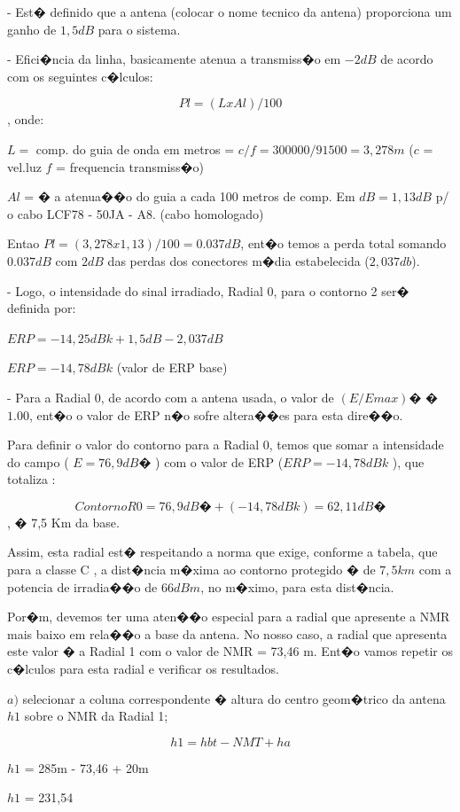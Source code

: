  - Est� definido que a antena (colocar o nome tecnico da antena) proporciona um ganho de $1,5 dB$ para o sistema.

 - Efici�ncia da linha, basicamente atenua  a transmiss�o em $-2 dB$ de acordo com os seguintes c�lculos:


$$Pl = ( L x Al ) / 100$$ , onde:


$L =$ comp. do guia de onda em metros = $c/f = 300000/91500 = 3,278m$ ($c$ = vel.luz $f$ = frequencia transmiss�o) 

$Al$ = � a atenua��o do guia a cada 100 metros de comp. Em $dB  = 1,13dB$ p/ o cabo LCF78 - 50JA - A8. (cabo homologado)

Entao $Pl = (3,278 x 1,13)/ 100 = 0.037 dB$, ent�o temos a perda total somando $0.037 dB$ com $2dB$ das perdas dos conectores m�dia estabelecida ($2,037 db$).

 - Logo, o intensidade do sinal irradiado, Radial 0,  para o contorno 2 ser� definida por:

   $ERP = -14,25dBk + 1,5dB - 2,037 dB$

   $ERP = -14,78dBk $  (valor de ERP base)

 - Para a Radial 0, de acordo com a antena usada, o valor de $(E/Emax)�$ � $1.00$, ent�o o valor de ERP n�o sofre altera��es para esta dire��o. 


Para definir o valor do contorno para a Radial 0, temos que somar a intensidade do campo ( $E = 76,9dB� $ ) com o valor de ERP  ($ERP = -14,78dBk $ ),
que totaliza :

$$ ContornoR0 = 76,9 dB� + (-14,78dBk) = 62,11 dB�$$ , � 7,5 Km da base.

Assim, esta radial est� respeitando a norma que exige, conforme a tabela, que 
para a classe C , a dist�ncia m�xima ao contorno protegido � de $7,5 km$ com a potencia de irradia��o de $66 dBm$, no m�ximo, para esta dist�ncia.

Por�m, devemos ter uma aten��o especial para a radial que apresente a NMR mais baixo em rela��o a base da antena. No nosso caso, a radial que apresenta este valor � a Radial 1
com o valor de NMR = 73,46 m. Ent�o vamos repetir os c�lculos para esta radial e verificar os resultados.

$a)$ selecionar a coluna correspondente � altura do centro geom�trico da antena $h1$ sobre o NMR da Radial 1;

$$h1 = hbt - NMT + ha$$

$h1$ = 285m - 73,46 + 20m

$h1$ = 231,54

